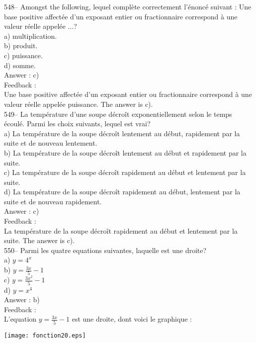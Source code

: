 ﻿\documentclass[letterpaper, 12pt]{article}
\begin{document}
548-- Amongst the following, lequel compl\`ete
correctement l'\'enonc\'e suivant : \og Une base positive affect\'ee
d'un exposant entier ou fractionnaire correspond \`a une valeur r\'eelle appel\'ee $\ldots$\fg ?\\
a) multiplication.\\
b) produit.\\
c) puissance.\\
d) somme.\\

Answer : c)\\

Feedback : \\
Une base positive affect\'ee d'un exposant entier ou fractionnaire
correspond \`a une valeur r\'eelle appel\'ee puissance.  The answer is
c).\\

549-- La temp\'erature d'une soupe d\'ecro\^it  exponentiellement selon le
temps \'ecoul\'e.  Parmi les choix suivants, lequel est vrai?\\
a) La temp\'erature de la soupe d\'ecro\^it lentement au d\'ebut, rapidement
par la suite et de nouveau lentement.\\
b) La temp\'erature de la soupe d\'ecro\^it lentement au d\'ebut et
rapidement par la suite.\\
c) La temp\'erature de la soupe d\'ecro\^it rapidement au d\'ebut et
lentement par la suite.  \\
d) La temp\'erature de la soupe d\'ecro\^it rapidement au d\'ebut, lentement
par la suite et de nouveau rapidement.\\

Answer : c)\\

Feedback : \\
La temp\'erature de la soupe d\'ecro\^it rapidement au d\'ebut et lentement
par la suite.  The answer is c).\\

550-- Parmi les quatre equations suivantes, laquelle est une droite?\\
a) $y=4^{x}$\\[2mm]
b) $y=\frac{3x}{5}-1$\\[2mm]
c) $y=\frac{3x^{2}}{5}-1$\\[2mm]
d) $y=x^{4}$\\

Answer : b)\\

Feedback : \\
L'equation $y=\frac{3x}{5}-1$ est une droite, dont voici le
graphique : \\
    \begin{center}
    \texttt{[image: fonction20.eps]}
    \end{center}
\end{document}
